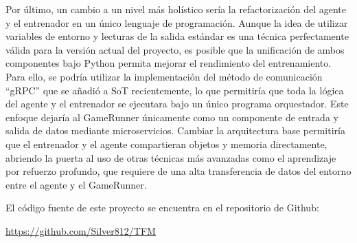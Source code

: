 Por último, un cambio a un nivel más holístico sería la refactorización del agente y el entrenador en un único lenguaje de programación. Aunque la idea de utilizar variables de entorno y lecturas de la salida estándar es una técnica perfectamente válida para la versión actual del proyecto, es posible que la unificación de ambos componentes bajo Python permita mejorar el rendimiento del entrenamiento. Para ello, se podría utilizar la implementación del método de comunicación ``gRPC'' que se añadió a SoT recientemente, lo que permitiría que toda la lógica del agente y el entrenador se ejecutara bajo un único programa orquestador. Este enfoque dejaría al GameRunner únicamente como un componente de entrada y salida de datos mediante microservicios. Cambiar la arquitectura base permitiría que el entrenador y el agente compartieran objetos y memoria directamente, abriendo la puerta al uso de otras técnicas más avanzadas como el aprendizaje por refuerzo profundo, que requiere de una alta transferencia de datos del entorno entre el agente y el GameRunner.

\vspace{30pt}

El código fuente de este proyecto se encuentra en el repositorio de Github:

\begin{center}
\url{https://github.com/Silver812/TFM}
\end{center}